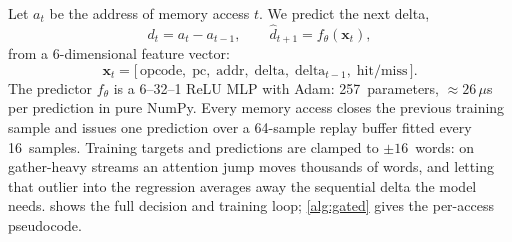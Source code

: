 \documentclass[conference]{IEEEtran}
\begin{document}
Let $a_t$ be the address of memory access $t$. We predict the next delta,
\begin{equation}
d_t = a_t - a_{t-1}, \qquad \hat{d}_{t+1} = f_\theta(\mathbf{x}_t),
\end{equation}
from a 6-dimensional feature vector:
\begin{equation}
\mathbf{x}_t = \bigl[\,\text{opcode},\;\text{pc},\;\text{addr},\;\text{delta},\;\text{delta}_{t-1},\;\text{hit/miss}\,\bigr].
\end{equation}
The predictor $f_\theta$ is a 6--32--1 ReLU MLP with Adam: 257~parameters,
${\approx}26\,\mu$s per prediction in pure NumPy. Every memory access closes
the previous training sample and issues one prediction over a 64-sample
replay buffer fitted every 16~samples. Training targets and predictions are
clamped to ${\pm}16$~words: on gather-heavy streams an attention jump moves
thousands of words, and letting that outlier into the regression averages
away the sequential delta the model needs.  shows the
full decision and training loop; \cref{alg:gated} gives the per-access
pseudocode.
\end{document}

